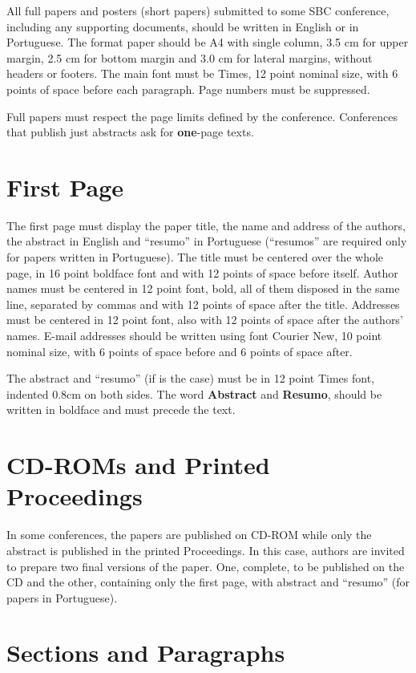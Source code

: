 \documentclass[12pt]{article}
\begin{document}
All full papers and posters (short papers) submitted to some SBC conference,
including any supporting documents, should be written in English or in
Portuguese. The format paper should be A4 with single column, 3.5 cm for upper
margin, 2.5 cm for bottom margin and 3.0 cm for lateral margins, without
headers or footers. The main font must be Times, 12 point nominal size, with 6
points of space before each paragraph. Page numbers must be suppressed.

Full papers must respect the page limits defined by the conference.
Conferences that publish just abstracts ask for \textbf{one}-page texts.

\section{First Page} \label{sec:firstpage}

The first page must display the paper title, the name and address of the
authors, the abstract in English and ``resumo'' in Portuguese (``resumos'' are
required only for papers written in Portuguese). The title must be centered
over the whole page, in 16 point boldface font and with 12 points of space
before itself. Author names must be centered in 12 point font, bold, all of
them disposed in the same line, separated by commas and with 12 points of
space after the title. Addresses must be centered in 12 point font, also with
12 points of space after the authors' names. E-mail addresses should be
written using font Courier New, 10 point nominal size, with 6 points of space
before and 6 points of space after.

The abstract and ``resumo'' (if is the case) must be in 12 point Times font,
indented 0.8cm on both sides. The word \textbf{Abstract} and \textbf{Resumo},
should be written in boldface and must precede the text.

\section{CD-ROMs and Printed Proceedings}

In some conferences, the papers are published on CD-ROM while only the
abstract is published in the printed Proceedings. In this case, authors are
invited to prepare two final versions of the paper. One, complete, to be
published on the CD and the other, containing only the first page, with
abstract and ``resumo'' (for papers in Portuguese).

\section{Sections and Paragraphs}
\end{document}

